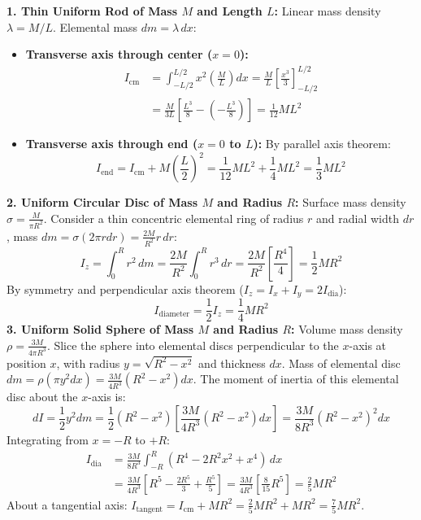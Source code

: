 \documentclass[10pt,twoside,openright]{book}
\begin{document}
\begin{formulabox}
\textbf{1. Thin Uniform Rod of Mass $M$ and Length $L$:}
Linear mass density $\lambda = M/L$. Elemental mass $dm = \lambda\,dx$:
\begin{itemize}
  \item \textbf{Transverse axis through center ($x = 0$):}
  \begin{align}
    I_{\text{cm}} &= \int_{-L/2}^{L/2} x^2 \left(\frac{M}{L}\right)dx = \frac{M}{L}\left[\frac{x^3}{3}\right]_{-L/2}^{L/2} \nonumber \\
    &= \frac{M}{3L}\left[\frac{L^3}{8} - \left(-\frac{L^3}{8}\right)\right] = \frac{1}{12}ML^2
  \end{align}
  \item \textbf{Transverse axis through end ($x = 0$ to $L$):} By parallel axis theorem:
  \begin{equation}
    I_{\text{end}} = I_{\text{cm}} + M\left(\frac{L}{2}\right)^2 = \frac{1}{12}ML^2 + \frac{1}{4}ML^2 = \frac{1}{3}ML^2
  \end{equation}
\end{itemize}
\textbf{2. Uniform Circular Disc of Mass $M$ and Radius $R$:}
Surface mass density $\sigma = \frac{M}{\pi R^2}$. Consider a thin concentric elemental ring of radius $r$ and radial width $dr$, mass $dm = \sigma(2\pi r dr) = \frac{2M}{R^2}r\,dr$:
\begin{equation}
  I_z = \int_0^R r^2\,dm = \frac{2M}{R^2}\int_0^R r^3\,dr = \frac{2M}{R^2}\left[\frac{R^4}{4}\right] = \frac{1}{2}MR^2
\end{equation}
By symmetry and perpendicular axis theorem ($I_z = I_x + I_y = 2I_{\text{dia}}$):
\begin{equation}
  I_{\text{diameter}} = \frac{1}{2}I_z = \frac{1}{4}MR^2
\end{equation}
\textbf{3. Uniform Solid Sphere of Mass $M$ and Radius $R$:}
Volume mass density $\rho = \frac{3M}{4\pi R^3}$. Slice the sphere into elemental discs perpendicular to the $x$-axis at position $x$, with radius $y = \sqrt{R^2 - x^2}$ and thickness $dx$.
Mass of elemental disc $dm = \rho(\pi y^2 dx) = \frac{3M}{4R^3}(R^2 - x^2)dx$.
The moment of inertia of this elemental disc about the $x$-axis is:
\begin{equation}
  dI = \frac{1}{2}y^2 dm = \frac{1}{2}(R^2 - x^2)\left[\frac{3M}{4R^3}(R^2 - x^2)dx\right] = \frac{3M}{8R^3}(R^2 - x^2)^2 dx
\end{equation}
Integrating from $x = -R$ to $+R$:
\begin{align}
  I_{\text{dia}} &= \frac{3M}{8R^3}\int_{-R}^{R} (R^4 - 2R^2 x^2 + x^4)\,dx \nonumber \\
  &= \frac{3M}{4R^3}\left[R^5 - \frac{2R^5}{3} + \frac{R^5}{5}\right] = \frac{3M}{4R^3}\left[\frac{8}{15}R^5\right] = \frac{2}{5}MR^2
\end{align}
About a tangential axis: $I_{\text{tangent}} = I_{\text{cm}} + MR^2 = \frac{2}{5}MR^2 + MR^2 = \frac{7}{5}MR^2$.


\end{formulabox}
\end{document}
